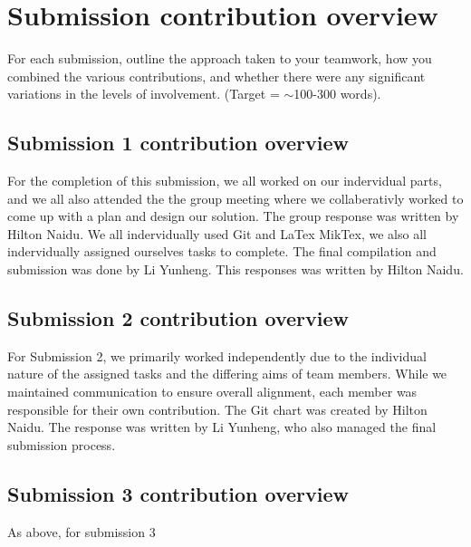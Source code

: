 \documentclass[a4paper, 11pt]{report}
\begin{document}

\newpage
\section{Submission contribution overview}

For each submission, outline the approach taken to your teamwork, how you combined the various contributions, and whether there were any significant variations in the levels of involvement. (Target = $\sim$100-300 words).

\subsection{Submission 1 contribution overview}

For the completion of this submission, we all worked on our indervidual parts, and we all also attended the the group meeting where we collaberativly worked to come up with a plan and design our solution. The group response was written by Hilton Naidu. We all indervidually used Git and LaTex MikTex, we also all indervidually assigned ourselves tasks to complete. The final compilation and submission was done by Li Yunheng. This responses was written by Hilton Naidu. 

\subsection{Submission 2 contribution overview}

For Submission 2, we primarily worked independently due to the individual nature of the assigned tasks and the differing aims of team members. While we maintained communication to ensure overall alignment, each member was responsible for their own contribution. The Git chart was created by Hilton Naidu. The response was written by Li Yunheng, who also managed the final submission process.

\subsection{Submission 3 contribution overview}

As above, for submission 3



\newpage



\end{document}
